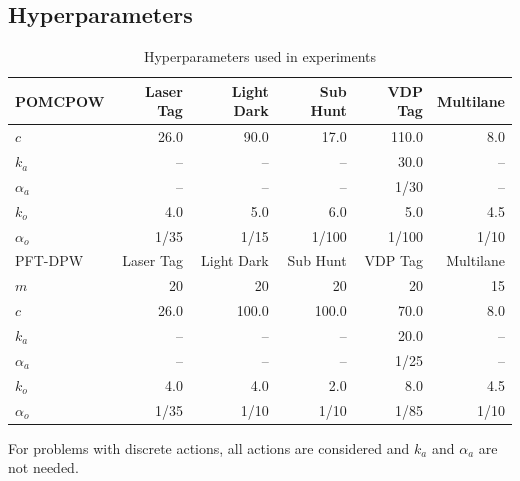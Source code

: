 \subsection{Hyperparameters} \label{sec:hyper}

\begin{table}[htbp]
    {\centering
\caption{Hyperparameters used in experiments} \label{tab:hyper}

\begin{center}
\begin{tabular}{lrrrrr}
    \toprule
    POMCPOW     & Laser Tag     & Light Dark    & Sub Hunt      & VDP Tag     & Multilane \\
    \midrule
    $c$         & \num{26.0}    & \num{90.0}    & \num{17.0}    & \num{110.0} & \num{8.0} \\
    $k_a$       & --            & --            & --            & \num{30.0}  & -- \\
    $\alpha_a$  & --            & --            & --            & \num{1/30}  & -- \\
    $k_o$       & \num{4.0}     & \num{5.0}     & \num{6.0}     & \num{5.0}   & \num{4.5} \\
    $\alpha_o$  & \num{1/35}    & \num{1/15}    & \num{1/100}   & \num{1/100} & \num{1/10} \\
    \midrule
    PFT-DPW     & Laser Tag     & Light Dark    & Sub Hunt      & VDP Tag     & Multilane \\
    \midrule
    $m$         & \num{20}      & \num{20}      & \num{20}      & \num{20}    & \num{15} \\
    $c$         & \num{26.0}    & \num{100.0}   & \num{100.0}   & \num{70.0}  & \num{8.0} \\
    $k_a$       & --            & --            & --            & \num{20.0}  & -- \\
    $\alpha_a$  & --            & --            & --            & \num{1/25}  & -- \\
    $k_o$       & \num{4.0}     & \num{4.0}     & \num{2.0}     & \num{8.0}   & \num{4.5} \\
    $\alpha_o$  & \num{1/35}    & \num{1/10}    & \num{1/10}    & \num{1/85}  & \num{1/10} \\
    \bottomrule

\end{tabular}

    \vspace{1mm}
    \footnotesize{For problems with discrete actions, all actions are considered and $k_a$ and $\alpha_a$ are not needed.}
\end{center}
    }
\end{table}

